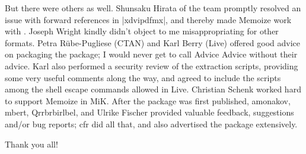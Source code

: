 \documentclass[a4paper,11pt]{article}
\begin{document}
But there were others as well.  Shunsaku Hirata of the  team
promptly resolved an issue with forward references in |xdvipdfmx|, and thereby
made Memoize work with .  Joseph Wright kindly didn't object to
me misappropriating  for other formats.  Petra Rübe-Pugliese
(CTAN) and Karl Berry (Live) offered good advice on packaging the
package; I would never get to call Advice Advice without their advice.  Karl
also performed a security review of the extraction scripts, providing some very
useful comments along the way, and agreed to include the scripts among the
shell escape commands allowed in Live.  Christian Schenk worked
hard to support Memoize in MiK.  After the package was first
published, amonakov, mbert, Qrrbrbirlbel, and Ulrike Fischer provided valuable
feedback, suggestions and\slash or bug reports; cfr did all that, and also
advertised the package extensively.

Thank you all!


\printindex
\end{document}

